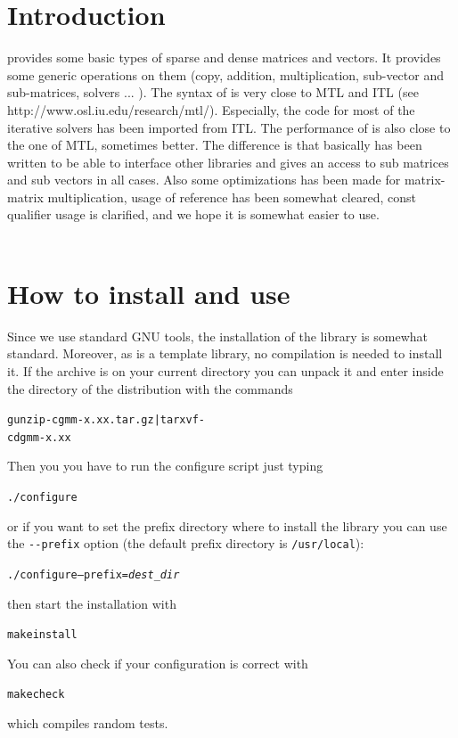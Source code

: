 \documentclass[11pt,a4paper]{article}
\begin{document}
\section*{Introduction}

\gmm provides some basic types of sparse and dense matrices and vectors. It provides some generic operations on them (copy, addition, multiplication, sub-vector and sub-matrices, solvers ... ). The syntax of \gmm is very close to MTL and ITL (see http://www.osl.iu.edu/research/mtl/). Especially, the code for most of the iterative solvers has been imported from ITL. The performance of \gmm is also close to the one of MTL, sometimes better. The difference is that basically \gmm has been written to be able to interface other libraries and gives an access to sub matrices and sub vectors in all cases. Also some optimizations has been made for matrix-matrix multiplication, usage of reference has been somewhat cleared, const qualifier usage is clarified, and we hope it is somewhat easier to use.\\ \\[3cm]
\htmlonly{\\\\\\}


\newpage
\tableofcontents
\newpage

\section{How to install and use \gmm}
Since we use standard GNU tools, the installation of the \gmm library is somewhat standard. Moreover, as \gmm is a template library, no compilation is needed to install it. If the \gmm  archive is on your current directory you can unpack it and enter inside the directory of the distribution  with the commands
\begin{alltt}
  gunzip -c gmm-x.xx.tar.gz | tar xvf -
  cd  gmm-x.xx
\end{alltt}
Then you you have to run the configure script just typing
\begin{alltt}
  ./configure
\end{alltt}
or if you want to set the prefix directory where to install the library you can use the {\tt {-}{-}prefix} option (the default prefix directory is {\tt /usr/local}):
\begin{alltt}
  ./configure --prefix=\textit{dest_dir}
\end{alltt}
then start the installation with
\begin{alltt}
  make install
\end{alltt}
You can also check if your configuration is correct with
\begin{alltt}
  make check
\end{alltt}
which compiles random tests.
\end{document}
